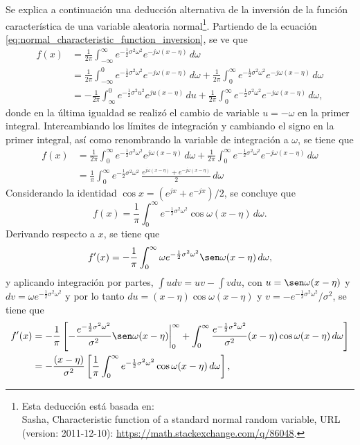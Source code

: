 \documentclass[a4paper]{report}
\begin{document}
Se explica a continuación una deducción alternativa de la inversión de la función característica de una variable aleatoria normal\footnote{Esta deducción está basada en:\\Sasha, Characteristic function of a standard normal random variable, URL (version: 2011-12-10): \url{https://math.stackexchange.com/q/86048}.}. Partiendo de la ecuación \ref{eq:normal_characteristic_function_inversion}, se ve que
\begin{align*}
 f(x)&=\frac{1}{2\pi}\int_{-\infty}^{\infty}e^{-\frac{1}{2}\sigma^2\omega^2}e^{-j\omega(x-\eta)}\,d\omega\\
 &=\frac{1}{2\pi}\int_{-\infty}^{0}e^{-\frac{1}{2}\sigma^2\omega^2}e^{-j\omega(x-\eta)}\,d\omega+ 
 \frac{1}{2\pi}\int_{0}^{\infty}e^{-\frac{1}{2}\sigma^2\omega^2}e^{-j\omega(x-\eta)}\,d\omega\\
 &=-\frac{1}{2\pi}\int_{\infty}^{0}e^{-\frac{1}{2}\sigma^2u^2}e^{ju(x-\eta)}\,du+ 
 \frac{1}{2\pi}\int_{0}^{\infty}e^{-\frac{1}{2}\sigma^2\omega^2}e^{-j\omega(x-\eta)}\,d\omega,
\end{align*}
donde en la última igualdad se realizó el cambio de variable \(u=-\omega\) en la primer integral. Intercambiando los límites de integración y cambiando el signo en la primer integral, así como renombrando la variable de integración a \(\omega\), se tiene que
\begin{align*}
 f(x)&=\frac{1}{2\pi}\int_{0}^{\infty}e^{-\frac{1}{2}\sigma^2\omega^2}e^{j\omega(x-\eta)}\,d\omega+ 
 \frac{1}{2\pi}\int_{0}^{\infty}e^{-\frac{1}{2}\sigma^2\omega^2}e^{-j\omega(x-\eta)}\,d\omega\\
  &=\frac{1}{\pi}\int_{0}^{\infty}e^{-\frac{1}{2}\sigma^2\omega^2}\,\frac{e^{j\omega(x-\eta)}+e^{-j\omega(x-\eta)}}{2}\,d\omega
\end{align*}
Considerando la identidad \(\cos x=(e^{jx}+e^{-jx})/2\), se concluye que
\begin{equation}\label{eq:gaussian_integral_complex_offset_tmp3}
 f(x)=\frac{1}{\pi}\int_{0}^{\infty}e^{-\frac{1}{2}\sigma^2\omega^2}\cos\omega(x-\eta)\,d\omega.
\end{equation}
Derivando respecto a \(x\), se tiene que
\[
 f'(x)=-\frac{1}{\pi}\int_{0}^{\infty}\omega e^{-\frac{1}{2}\sigma^2\omega^2}\sen\omega(x-\eta)\,d\omega,
\]
y aplicando integración por partes, \(\int udv=uv-\int vdu\), con \(u=\sen\omega(x-\eta)\) y \(dv=\omega e^{-\frac{1}{2}\sigma^2\omega^2}\) y por lo tanto \(du=(x-\eta)\cos\omega(x-\eta)\) y \(v=-e^{-\frac{1}{2}\sigma^2\omega^2}/\sigma^2\), se tiene que
\begin{align*}
 f'(x)&=-\frac{1}{\pi}\left[-\frac{e^{-\frac{1}{2}\sigma^2\omega^2}}{\sigma^2}\sen\omega(x-\eta)\bigg|_{0}^{\infty} + \int_{0}^{\infty}\frac{e^{-\frac{1}{2}\sigma^2\omega^2}}{\sigma^2}(x-\eta)\cos\omega(x-\eta)\,d\omega\right]\\
  &=-\frac{(x-\eta)}{\sigma^2}\left[\frac{1}{\pi}\int_{0}^{\infty}e^{-\frac{1}{2}\sigma^2\omega^2}\cos\omega(x-\eta)\,d\omega\right],
\end{align*}
\end{document}
